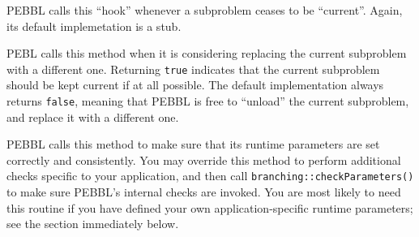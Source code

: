 PEBBL calls this ``hook'' whenever a subproblem ceases to be
``current''.  Again, its default implemetation is a stub.

PEBL calls this method when it is considering replacing the current
subproblem with a different one.  Returning \texttt{true} indicates
that the current subproblem should be kept current if at all possible.
The default implementation always returns \texttt{false}, meaning that
PEBBL is free to ``unload'' the current subproblem, and replace it
with a different one.

 PEBBL calls this method to
make sure that its runtime parameters are set correctly and
consistently.  You may override this method to perform additional
checks specific to your application, and then call
\texttt{branching::checkParameters()} to make sure PEBBL's internal
checks are invoked.  You are most likely to need this routine if you
have defined your own application-specific runtime parameters; see the
section immediately below.

